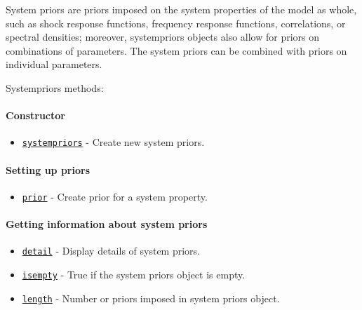 

	System priors are priors imposed on the system properties of the model
 as whole, such as shock response functions, frequency response
 functions, correlations, or spectral densities; moreover, systempriors
 objects also allow for priors on combinations of parameters. The system
 priors can be combined with priors on individual parameters.
 
 Systempriors methods:
 
 \paragraph{Constructor}
 
 \begin{itemize}
 \item
   \href{systempriors/systempriors}{\texttt{systempriors}} - Create new
   system priors.
 \end{itemize}
 
 \paragraph{Setting up priors}
 
 \begin{itemize}
 \item
   \href{systempriors/prior}{\texttt{prior}} - Create prior for a system
   property.
 \end{itemize}
 
 \paragraph{Getting information about system priors}
 
 \begin{itemize}
 \item
   \href{systempriors/detail}{\texttt{detail}} - Display details of
   system priors.
 \item
   \href{systempriors/isempty}{\texttt{isempty}} - True if the system
   priors object is empty.
 \item
   \href{systempriors/length}{\texttt{length}} - Number or priors imposed
   in system priors object.
 \end{itemize}




